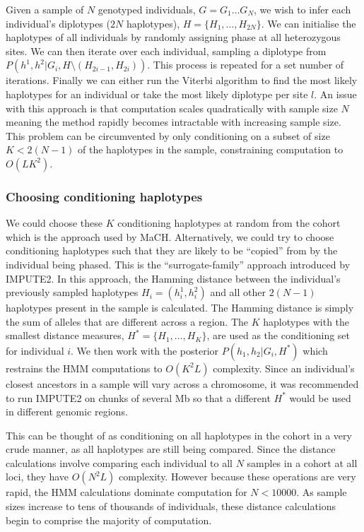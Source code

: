 Given a sample of $N$ genotyped individuals, $G = G_1\ldots G_N$, we wish to infer each individual's diplotypes ($2N$ haplotypes), $H = \{H_1,\ldots,H_{2N}\}$.  We can initialise the haplotypes of all individuals by randomly assigning phase at all heterozygous sites.  We can then iterate over each individual, sampling a diplotype from $P(h^1,h^2|G_i,H \setminus (H_{2i-1},H_{2i}))$.  This process is repeated for a set number of iterations.  Finally we can either run the Viterbi algorithm to find the most likely haplotypes for an individual or take the most likely diplotype per site $l$. An issue with this approach is that computation scales quadratically with sample size $N$ meaning the method rapidly becomes intractable with increasing sample size.  This problem can be circumvented by only conditioning on a subset of size $K<2(N-1)$ of the haplotypes in the sample, constraining computation to $O(LK^2)$.

\subsubsection{Choosing conditioning haplotypes}
We could choose these $K$ conditioning haplotypes at random from the cohort which is the approach used by MaCH.  Alternatively, we could try to choose conditioning haplotypes such that they are likely to be ``copied'' from by the individual being phased. This is the ``surrogate-family'' approach introduced by IMPUTE2. In this approach, the Hamming distance between the individual's previously sampled haplotypes $H_i=(h^1_i,h^2_i)$ and all other $2(N-1)$ haplotypes present in the sample is calculated. The Hamming distance is simply the sum of alleles that are different across a region.  The $K$ haplotypes with the smallest distance measures, $H^{*}=\{H_1,\ldots,H_K\}$, are used as the conditioning set for individual $i$.  We then work with the posterior $P(h_1,h_2|G_i,H^{*})$  which restrains the HMM computations to $O(K^2L)$ complexity. Since an individual's closest ancestors in a sample will vary across a chromosome, it was recommended to run IMPUTE2 on chunks of several Mb so that a different $H^{*}$ would be used in different genomic regions.

This can be thought of as conditioning on all haplotypes in the cohort in a very crude manner, as all haplotypes are still being compared.  Since the distance calculations involve comparing each individual to all $N$ samples in a cohort at all loci, they have $O(N^2L)$ complexity.  However because these operations are very rapid, the HMM calculations dominate computation for $N<10000$.  As sample sizes increase to tens of thousands of individuals, these distance calculations begin to comprise the majority of computation. 

